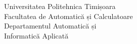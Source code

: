\begin{titlepage}
    \begin{center}
        \begin{minipage}{0.3\textwidth}
        \end{minipage}%
        \begin{minipage}{0.4\textwidth}
            \centering
            \scriptsize
            Universitatea Politehnica Timișoara\\
            Facultatea de Automatică și Calculatoare\\
            Departamentul Automatică și \\Informatică Aplicată
        \end{minipage}%
        \begin{minipage}{0.3\textwidth}
            \begin{flushright}
            \end{flushright}
        \end{minipage}
    \end{center}


\end{titlepage}
